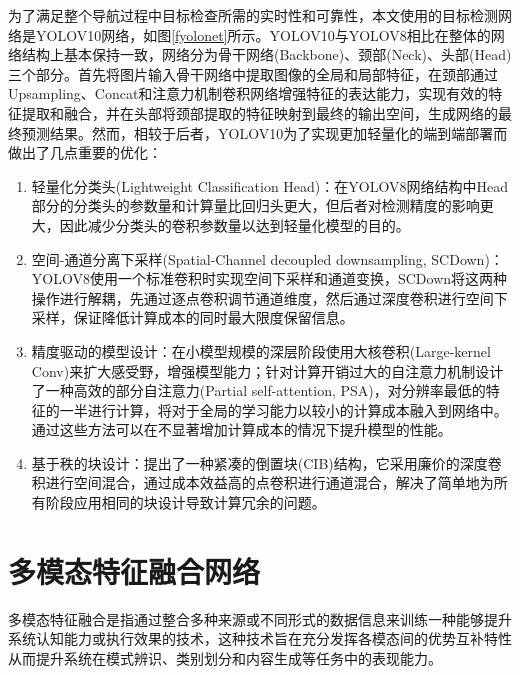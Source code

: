 为了满足整个导航过程中目标检查所需的实时性和可靠性，本文使用的目标检测网络是YOLOV10网络\cite{wang2025yolov10}，如图\ref{fyolonet}所示。YOLOV10与YOLOV8\cite{varghese2024yolov8}相比在整体的网络结构上基本保持一致，网络分为骨干网络(Backbone)、颈部(Neck)、头部(Head)三个部分。首先将图片输入骨干网络中提取图像的全局和局部特征，在颈部通过Upsampling、Concat和注意力机制卷积网络增强特征的表达能力，实现有效的特征提取和融合，并在头部将颈部提取的特征映射到最终的输出空间，生成网络的最终预测结果。然而，相较于后者，YOLOV10为了实现更加轻量化的端到端部署而做出了几点重要的优化：
\begin{enumerate}[topsep = 0 pt, itemsep= 0 pt, parsep=0pt, partopsep=0pt, leftmargin=44pt, itemindent=0pt, labelsep=6pt, label=(\arabic*)]
    \item 	轻量化分类头(Lightweight Classification Head)：在YOLOV8网络结构中Head部分的分类头的参数量和计算量比回归头更大，但后者对检测精度的影响更大，因此减少分类头的卷积参数量以达到轻量化模型的目的。
    \item	空间-通道分离下采样(Spatial-Channel decoupled downsampling, SCDown)：YOLOV8使用一个标准卷积时实现空间下采样和通道变换，SCDown将这两种操作进行解耦，先通过逐点卷积调节通道维度，然后通过深度卷积进行空间下采样，保证降低计算成本的同时最大限度保留信息。
    \item   精度驱动的模型设计：在小模型规模的深层阶段使用大核卷积(Large-kernel Conv)来扩大感受野，增强模型能力；针对计算开销过大的自注意力机制设计了一种高效的部分自注意力(Partial self-attention, PSA)，对分辨率最低的特征的一半进行计算，将对于全局的学习能力以较小的计算成本融入到网络中。通过这些方法可以在不显著增加计算成本的情况下提升模型的性能。
    \item   基于秩的块设计：提出了一种紧凑的倒置块(CIB)结构，它采用廉价的深度卷积进行空间混合，通过成本效益高的点卷积进行通道混合，解决了简单地为所有阶段应用相同的块设计导致计算冗余的问题。
\end{enumerate}


\section{多模态特征融合网络}

多模态特征融合是指通过整合多种来源或不同形式的数据信息来训练一种能够提升系统认知能力或执行效果的技术，这种技术旨在充分发挥各模态间的优势互补特性从而提升系统在模式辨识、类别划分和内容生成等任务中的表现能力。


